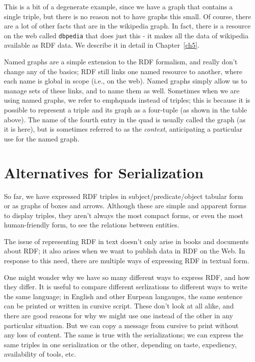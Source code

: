 This is a bit of a degenerate example, since we have a graph that contains a single triple, 
but there is no reason not to have graphs this small.  Of course, there are a lot of other 
facts that are in the wikipedia graph.  In fact, there is a resource on the web called \texttt{dbpedia} that
does just this - it makes all the data of wikipedia available as RDF data.  We describe it in 
detail in Chapter~\ref{ch5}.


Named graphs are a simple extension to the RDF formalism, and really don't change any of the basics; 
RDF still links one named resource to another, where each name is global in scope (i.e., on the web). 
Named graphs simply allow us to manage sets of these links, and to name them as well.  Sometimes when
we are using named graphs, we refer to emph{quads} instead of triples; this is because it is possible
to represent a triple and its graph as a four-tuple (as shown in the table above).  The name of the 
fourth entry in the quad is usually called the graph (as it is here), but is sometimes referred to as 
the \emph{context}, anticipating a particular use for the named graph. 

\section{Alternatives for Serialization}
\label{serialization}
So far, we have expressed RDF triples in subject/predicate/object
tabular form or as graphs of boxes and arrows. Although these are simple
and apparent forms to display triples, they aren't always the most
compact forms, or even the most human-friendly form, to see the
relations between entities.

The issue of representing RDF in text doesn't only arise in books and
documents about RDF; it also arises when we want to publish data in RDF
on the Web. In response to this need, there are multiple ways of
expressing RDF in textual form.

One might wonder why we have so many different ways to express RDF, and how they 
differ.  It is useful to compare different serlizations to different ways to write
the same language; in English and other Eurpean langauges, the same sentence can be printed
or written in cursive script.  These don't look at all alike, and there are good reasons
for why we might use one instead of the other in any particular situation.   But we can copy 
a message from cursive to print without any loss of content.  The same is true with the serializations; 
we can express the same triples in one serialization or the other, depending on taste, expediency, 
availability of tools, etc. 

